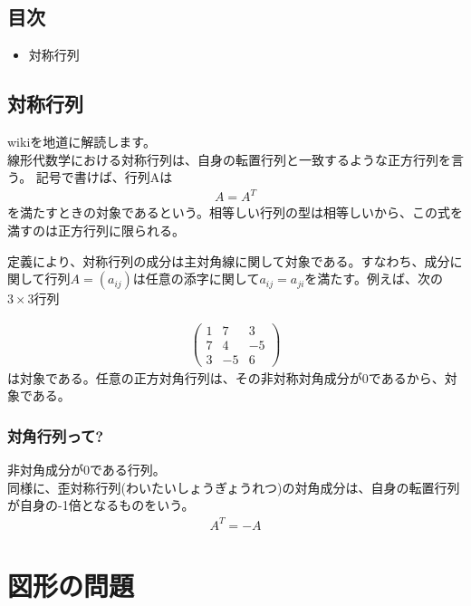 \section{目次}
 \begin{itemize}
  \item 対称行列
 \end{itemize}

 \section{対称行列}
 wikiを地道に解読します。\\
 線形代数学における対称行列は、自身の転置行列と一致するような正方行列を言う。
 記号で書けば、行列Aは
 \begin{eqnarray}
  A = A^T
 \end{eqnarray}
 を満たすときの対象であるという。相等しい行列の型は相等しいから、この式を満すのは正方行列に限られる。

 定義により、対称行列の成分は主対角線に関して対象である。すなわち、成分に関して行列$A=(a_{ij})$は任意の添字に関して$a_{ij} = a_{ji}$を満たす。例えば、次の$3 \times 3$行列

 \begin{eqnarray}
  \left(
   \begin{matrix}
	1&7&3\\
	7&4&-5\\
	3&-5&6
   \end{matrix}
   \right)
 \end{eqnarray}
は対象である。任意の正方対角行列は、その非対称対角成分が0であるから、対象である。


\subsection{対角行列って?}
非対角成分が0である行列。\\

同様に、歪対称行列(わいたいしょうぎょうれつ)の対角成分は、自身の転置行列が自身の-1倍となるものをいう。
 \begin{eqnarray}
  A^T = -A
 \end{eqnarray}


\newpage
\chapter{図形の問題}
